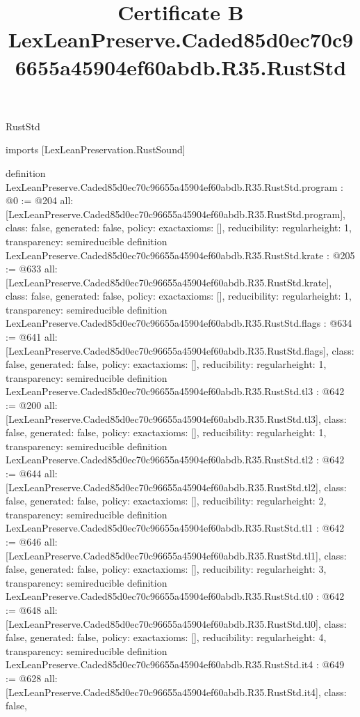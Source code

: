 \begin{lexlean}{RustStd}
\title{Certificate B LexLeanPreserve.Caded85d0ec70c96655a45904ef60abdb.R35.RustStd}
\begin{coremodule}
imports [LexLeanPreservation.RustSound]

definition LexLeanPreserve.Caded85d0ec70c96655a45904ef60abdb.R35.RustStd.program : @0 := @204 {
  all: [LexLeanPreserve.Caded85d0ec70c96655a45904ef60abdb.R35.RustStd.program],
  class: false,
  generated: false,
  policy: exact{axioms: []},
  reducibility: regular{height: 1},
  transparency: semireducible
}
definition LexLeanPreserve.Caded85d0ec70c96655a45904ef60abdb.R35.RustStd.krate : @205 := @633 {
  all: [LexLeanPreserve.Caded85d0ec70c96655a45904ef60abdb.R35.RustStd.krate],
  class: false,
  generated: false,
  policy: exact{axioms: []},
  reducibility: regular{height: 1},
  transparency: semireducible
}
definition LexLeanPreserve.Caded85d0ec70c96655a45904ef60abdb.R35.RustStd.flags : @634 := @641 {
  all: [LexLeanPreserve.Caded85d0ec70c96655a45904ef60abdb.R35.RustStd.flags],
  class: false,
  generated: false,
  policy: exact{axioms: []},
  reducibility: regular{height: 1},
  transparency: semireducible
}
definition LexLeanPreserve.Caded85d0ec70c96655a45904ef60abdb.R35.RustStd.tl3 : @642 := @200 {
  all: [LexLeanPreserve.Caded85d0ec70c96655a45904ef60abdb.R35.RustStd.tl3],
  class: false,
  generated: false,
  policy: exact{axioms: []},
  reducibility: regular{height: 1},
  transparency: semireducible
}
definition LexLeanPreserve.Caded85d0ec70c96655a45904ef60abdb.R35.RustStd.tl2 : @642 := @644 {
  all: [LexLeanPreserve.Caded85d0ec70c96655a45904ef60abdb.R35.RustStd.tl2],
  class: false,
  generated: false,
  policy: exact{axioms: []},
  reducibility: regular{height: 2},
  transparency: semireducible
}
definition LexLeanPreserve.Caded85d0ec70c96655a45904ef60abdb.R35.RustStd.tl1 : @642 := @646 {
  all: [LexLeanPreserve.Caded85d0ec70c96655a45904ef60abdb.R35.RustStd.tl1],
  class: false,
  generated: false,
  policy: exact{axioms: []},
  reducibility: regular{height: 3},
  transparency: semireducible
}
definition LexLeanPreserve.Caded85d0ec70c96655a45904ef60abdb.R35.RustStd.tl0 : @642 := @648 {
  all: [LexLeanPreserve.Caded85d0ec70c96655a45904ef60abdb.R35.RustStd.tl0],
  class: false,
  generated: false,
  policy: exact{axioms: []},
  reducibility: regular{height: 4},
  transparency: semireducible
}
definition LexLeanPreserve.Caded85d0ec70c96655a45904ef60abdb.R35.RustStd.it4 : @649 := @628 {
  all: [LexLeanPreserve.Caded85d0ec70c96655a45904ef60abdb.R35.RustStd.it4],
  class: false,
}
\end{coremodule}
\end{lexlean}
